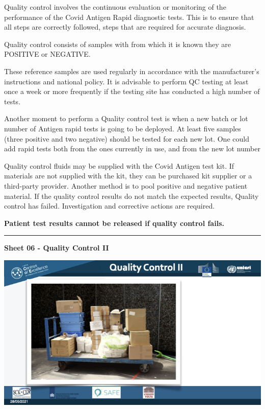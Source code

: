 \documentclass[
]{book}
\begin{document}
Quality control involves the continuous evaluation or monitoring of the
performance of the Covid Antigen Rapid diagnostic tests. This is to
ensure that all steps are correctly followed, steps that are required
for accurate diagnosis.

Quality control consists of samples with from which it is known they are
POSITIVE or NEGATIVE.

These reference samples are used regularly in accordance with the
manufacturer's instructions and national policy. It is advisable to
perform QC testing at least once a week or more frequently if the
testing site has conducted a high number of tests.

Another moment to perform a Quality control test is when a new batch or
lot number of Antigen rapid tests is going to be deployed. At least five
samples (three positive and two negative) should be tested for each new
lot. One could add rapid tests both from the ones currently in use, and
from the new lot number

Quality control fluids may be supplied with the Covid Antigen test kit.
If materials are not supplied with the kit, they can be purchased kit
supplier or a third-party provider. Another method is to pool positive
and negative patient material. If the quality control results do not
match the expected results, Quality control has failed. Investigation
and corrective actions are required.

\textbf{Patient test results cannot be released if quality control fails.}

\begin{center}\rule{0.5\linewidth}{0.5pt}\end{center}

\textbf{Sheet 06 - Quality Control II}

\includegraphics{images/m04/m04_Quality_management_v3.006.jpeg}
\end{document}
